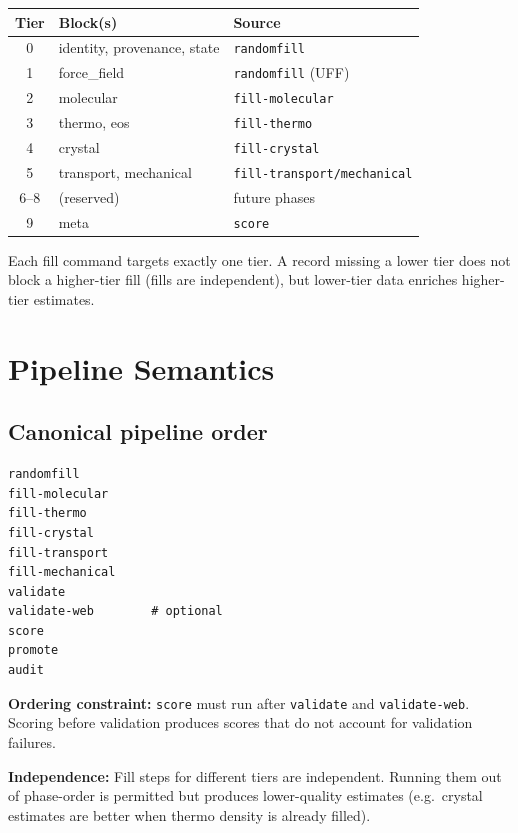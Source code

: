 \documentclass[11pt,letterpaper]{article}
\begin{document}
\begin{center}
\begin{tabular}{cll}
\toprule
Tier & Block(s) & Source \\
\midrule
0 & identity, provenance, state & \texttt{randomfill} \\
1 & force\_field                 & \texttt{randomfill} (UFF) \\
2 & molecular                    & \texttt{fill-molecular} \\
3 & thermo, eos                  & \texttt{fill-thermo} \\
4 & crystal                      & \texttt{fill-crystal} \\
5 & transport, mechanical        & \texttt{fill-transport/mechanical} \\
6--8 & (reserved)               & future phases \\
9 & meta                         & \texttt{score} \\
\bottomrule
\end{tabular}
\end{center}

Each fill command targets exactly one tier.  A record missing a lower
tier does not block a higher-tier fill (fills are independent), but
lower-tier data enriches higher-tier estimates.

\section{Pipeline Semantics}

\subsection{Canonical pipeline order}

\begin{lstlisting}
randomfill
fill-molecular
fill-thermo
fill-crystal
fill-transport
fill-mechanical
validate
validate-web        # optional
score
promote
audit
\end{lstlisting}

\textbf{Ordering constraint:} \texttt{score} must run after \texttt{validate}
and \texttt{validate-web}.  Scoring before validation produces scores that
do not account for validation failures.

\textbf{Independence:} Fill steps for different tiers are independent.
Running them out of phase-order is permitted but produces lower-quality
estimates (e.g.\ crystal estimates are better when thermo density is
already filled).
\end{document}

